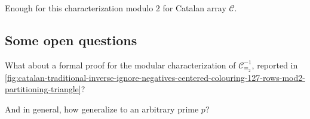 Enough for this characterization modulo $2$ for Catalan array $\mathcal{C}$.

\subsection{Some open questions}

What about a formal proof for the modular characterization of $\mathcal{C}_{\equiv_{2}}^{-1}$, reported in 
\autoref{fig:catalan-traditional-inverse-ignore-negatives-centered-colouring-127-rows-mod2-partitioning-triangle}?

And in general, how generalize to an arbitrary prime $p$?
